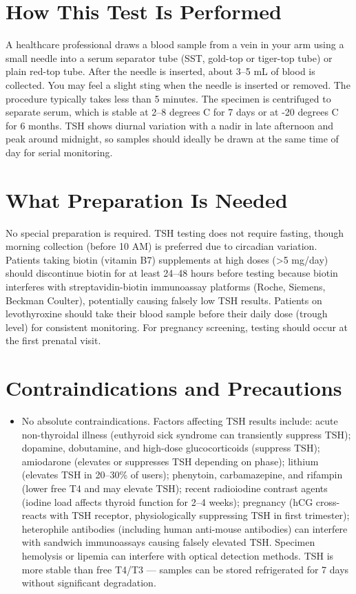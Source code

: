 \section*{How This Test Is Performed}
A healthcare professional draws a blood sample from a vein in your arm using a small needle into a serum separator tube (SST, gold-top or tiger-top tube) or plain red-top tube. After the needle is inserted, about 3--5 mL of blood is collected. You may feel a slight sting when the needle is inserted or removed. The procedure typically takes less than 5 minutes. The specimen is centrifuged to separate serum, which is stable at 2--8 degrees C for 7 days or at -20 degrees C for 6 months. TSH shows diurnal variation with a nadir in late afternoon and peak around midnight, so samples should ideally be drawn at the same time of day for serial monitoring.

\section*{What Preparation Is Needed}
No special preparation is required. TSH testing does not require fasting, though morning collection (before 10 AM) is preferred due to circadian variation. Patients taking biotin (vitamin B7) supplements at high doses (>5 mg/day) should discontinue biotin for at least 24--48 hours before testing because biotin interferes with streptavidin-biotin immunoassay platforms (Roche, Siemens, Beckman Coulter), potentially causing falsely low TSH results. Patients on levothyroxine should take their blood sample before their daily dose (trough level) for consistent monitoring. For pregnancy screening, testing should occur at the first prenatal visit.

\section*{Contraindications and Precautions}
\begin{itemize}
  \item No absolute contraindications. Factors affecting TSH results include: acute non-thyroidal illness (euthyroid sick syndrome can transiently suppress TSH); dopamine, dobutamine, and high-dose glucocorticoids (suppress TSH); amiodarone (elevates or suppresses TSH depending on phase); lithium (elevates TSH in 20--30\% of users); phenytoin, carbamazepine, and rifampin (lower free T4 and may elevate TSH); recent radioiodine contrast agents (iodine load affects thyroid function for 2--4 weeks); pregnancy (hCG cross-reacts with TSH receptor, physiologically suppressing TSH in first trimester); heterophile antibodies (including human anti-mouse antibodies) can interfere with sandwich immunoassays causing falsely elevated TSH. Specimen hemolysis or lipemia can interfere with optical detection methods. TSH is more stable than free T4/T3 --- samples can be stored refrigerated for 7 days without significant degradation.
\end{itemize}
